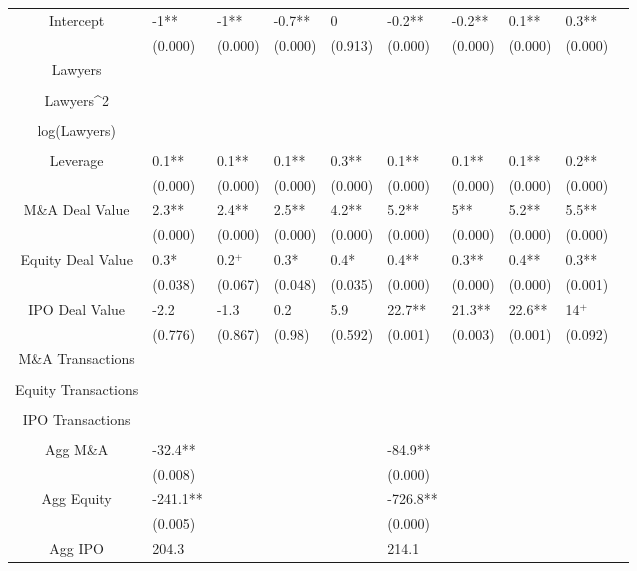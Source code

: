 \documentclass{article}
\begin{document}
\begin{table}[H]
\begin{tabular}{|clllllllll|}
Intercept & -1** & -1** & -0.7** & 0 & -0.2** & -0.2** & 0.1** & 0.3** & \\
   & (0.000) & (0.000) & (0.000) & (0.913) & (0.000) & (0.000) & (0.000) & (0.000) & \\
  Lawyers &  &  &  &  &  &  &  &  & \\
   &  &  &  &  &  &  &  &  & \\
  Lawyers^2 &  &  &  &  &  &  &  &  & \\
   &  &  &  &  &  &  &  &  & \\
  log(Lawyers) &  &  &  &  &  &  &  &  & \\
   &  &  &  &  &  &  &  &  & \\
  Leverage & 0.1** & 0.1** & 0.1** & 0.3** & 0.1** & 0.1** & 0.1** & 0.2** & \\
   & (0.000) & (0.000) & (0.000) & (0.000) & (0.000) & (0.000) & (0.000) & (0.000) & \\
  M\&A Deal Value & 2.3** & 2.4** & 2.5** & 4.2** & 5.2** & 5** & 5.2** & 5.5** & \\
   & (0.000) & (0.000) & (0.000) & (0.000) & (0.000) & (0.000) & (0.000) & (0.000) & \\
  Equity Deal Value & 0.3* & 0.2$^{+}$ & 0.3* & 0.4* & 0.4** & 0.3** & 0.4** & 0.3** & \\
   & (0.038) & (0.067) & (0.048) & (0.035) & (0.000) & (0.000) & (0.000) & (0.001) & \\
  IPO Deal Value & -2.2 & -1.3 & 0.2 & 5.9 & 22.7** & 21.3** & 22.6** & 14$^{+}$ & \\
   & (0.776) & (0.867) & (0.98) & (0.592) & (0.001) & (0.003) & (0.001) & (0.092) & \\
  M\&A Transactions &  &  &  &  &  &  &  &  & \\
   &  &  &  &  &  &  &  &  & \\
  Equity Transactions &  &  &  &  &  &  &  &  & \\
   &  &  &  &  &  &  &  &  & \\
  IPO Transactions &  &  &  &  &  &  &  &  & \\
   &  &  &  &  &  &  &  &  & \\
  Agg M\&A & -32.4** &  &  &  & -84.9** &  &  &  & \\
   & (0.008) &  &  &  & (0.000) &  &  &  & \\
  Agg Equity & -241.1** &  &  &  & -726.8** &  &  &  & \\
   & (0.005) &  &  &  & (0.000) &  &  &  & \\
  Agg IPO & 204.3 &  &  &  & 214.1 &  &  &  & \\

\end{tabular}
\end{table}
\end{document}
